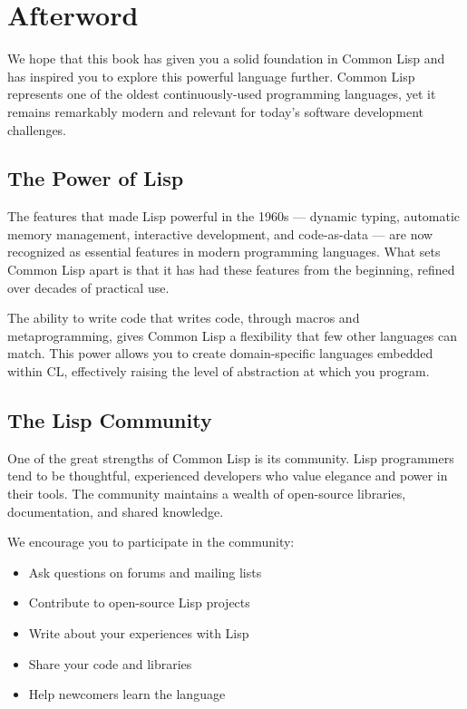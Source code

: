 \chapter*{Afterword}

We hope that this book has given you a solid foundation in Common Lisp and has inspired
you to explore this powerful language further. Common Lisp represents one of the oldest
continuously-used programming languages, yet it remains remarkably modern and relevant
for today's software development challenges.

\section*{The Power of Lisp}

The features that made Lisp powerful in the 1960s --- dynamic typing, automatic memory
management, interactive development, and code-as-data --- are now recognized as essential
features in modern programming languages. What sets Common Lisp apart is that it has
had these features from the beginning, refined over decades of practical use.

The ability to write code that writes code, through macros and metaprogramming, gives
Common Lisp a flexibility that few other languages can match. This power allows you to
create domain-specific languages embedded within CL, effectively raising the level of abstraction at which you program.

\section*{The Lisp Community}

One of the great strengths of Common Lisp is its community. Lisp programmers tend to be
thoughtful, experienced developers who value elegance and power in their tools. The community maintains a wealth of open-source libraries, documentation, and shared knowledge.

We encourage you to participate in the community:

\begin{itemize}
\item Ask questions on forums and mailing lists
\item Contribute to open-source Lisp projects
\item Write about your experiences with Lisp
\item Share your code and libraries
\item Help newcomers learn the language
\end{itemize}

